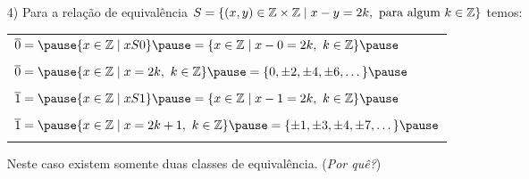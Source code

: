\documentclass{beamer}
\begin{document}
    \begin{frame}
        \begin{exemplos}
            \begin{enumerate}
                \item[4)] Para a rela\c{c}\~ao de equival\^encia $S = \{(x,y)\in \mathbb{Z} \times \mathbb{Z} \mid x - y = 2k, \mbox{ para algum } k \in \mathbb{Z}\}$ temos:
                \begin{center}
                    \begin{tabular}{l}
                        $\overline{0} = \pause \{x \in \z \mid xS0 \} \pause = \{x \in \z \mid x - 0 = 2k,\ k \in \z\} \pause$\\ \\
                        $\overline{0} = \pause \{x \in \z \mid x = 2k,\ k \in \z\} \pause = \{0, \pm 2, \pm 4, \pm 6, \dots\} \pause$\\ \\
                        $\overline{1} = \pause \{x \in \z \mid xS1 \} \pause = \{x \in \z \mid x - 1 = 2k,\ k \in \z\} \pause$\\ \\
                        $\overline{1} = \pause \{x \in \z \mid x = 2k + 1,\ k \in \z\} \pause = \{\pm 1, \pm 3, \pm 4, \pm 7, \dots\} \pause$\\ \\
                    \end{tabular}
                \end{center}
                Neste caso existem somente duas classes de equival\^encia. (\textit{Por qu\^e?})
            \end{enumerate}
        \end{exemplos}
    \end{frame}
\end{document}
